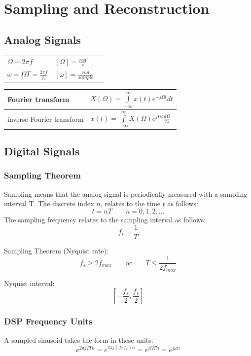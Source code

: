 \section{Sampling and Reconstruction}
\subsection{Analog Signals}

\begin{tabularx}{0.5\linewidth}{l l X}
  $\Omega = 2\pi f$ & $[\Omega] = \frac{rad}{s}$\\
  $\omega = \Omega T = \frac{2\pi f}{f_s}$ & $[\omega] = \frac{rad}{sample}$
\end{tabularx}
\begin{tabularx}{0.5\linewidth}{|l|X|}
	\hline
	Fourier transform & $X(\Omega) = \int\limits_{-\infty}^{\infty} x(t)e^{-j\Omega t}dt$ \\
	\hline
	inverse Fourier transform & $ x(t) = \int\limits_{-\infty}^{\infty} X(\Omega)e^{j\Omega t} \frac{d\Omega}{2 \pi} $ \\
	\hline
\end{tabularx}

\subsection{Digital Signals}
\subsubsection{Sampling Theorem}
Sampling means that the analog signal is periodically measured with a sampling interval T. The discrete index $n$, relates to
the time $t$ as follows:
\[ t = nT \qquad n = 0,1,2,\ldots \]
The sampling frequency relates to the sampling interval as follows:
\[ f_s = \frac{1}{T} \]
\begin{multicols}{2}
  Sampling Theorem (Nyquist rate):
  \[ f_s \geq 2f_{max} \qquad \text{or} \qquad T \leq \frac{1}{2f_{max}} \]
  
\columnbreak

  Nyquist interval:
  \[ \left[-\frac{f_s}{2}, \frac{f_s}{2}\right] \]
  
\end{multicols}



\subsubsection{DSP Frequency Units}
A sampled sinusoid takes the form in these units:
\[
	e^{2\pi jfTn} = e^{2\pi j (f/f_s)n} = e^{j\Omega Tn} = e^{j\omega n}
\]

